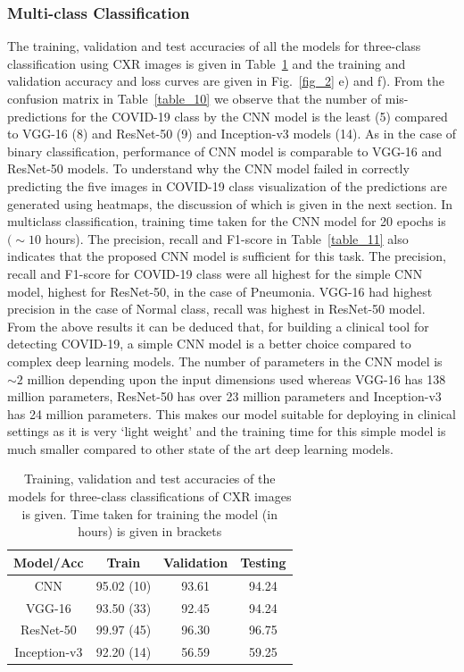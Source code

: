 \documentclass[10pt,journal,compsoc]{IEEEtran}
\begin{document}
\subsubsection{Multi-class Classification}
The training, validation and test accuracies of all the models for three-class classification using CXR images is given in Table~\ref{table_9} and the training and validation accuracy and loss curves are given in Fig.~\ref{fig_2} e) and f). From the confusion matrix in Table~\ref{table_10} we observe that the number of mis-predictions for the COVID-19 class by the CNN model is the least (5) compared to VGG-16 (8) and ResNet-50 (9) and Inception-v3 models (14). As in the case of binary classification, performance of CNN model is comparable to VGG-16 and ResNet-50 models. To understand why the CNN model failed in correctly predicting the five images in COVID-19 class visualization of the predictions are generated using heatmaps, the discussion of which is given in the next section. In multiclass classification, training time taken for the CNN model for 20 epochs is \((\sim10\) hours). The precision, recall and F1-score in Table~\ref{table_11} also indicates that the proposed CNN model is sufficient for this task. The precision, recall and F1-score for COVID-19 class were all highest for the simple CNN model, highest for ResNet-50, in the case of Pneumonia. VGG-16 had highest precision in the case of Normal class, recall was highest in ResNet-50 model. From the above results it can be deduced that, for building a clinical tool for detecting COVID-19, a simple CNN model is a better choice compared to complex deep learning models. The number of parameters in the CNN model is \(\sim2\) million depending upon the input dimensions used whereas VGG-16 has 138 million parameters, ResNet-50 has over 23 million parameters and Inception-v3 has 24 million parameters. This makes our model suitable for deploying in clinical settings as it is very ‘light weight’ and the training time for this simple model is much smaller compared to other state of the art deep learning models.

\begin{table}
\renewcommand{\arraystretch}{1.3}
\caption{Training, validation and test accuracies of the models for three-class classifications of CXR images is given. Time taken for training the model (in hours) is given in brackets}
\label{table_9}
\centering
\begin{tabular}{|c|c|c|c|}
\hline
\bfseries Model/Acc &  \bfseries Train & \bfseries Validation & \bfseries Testing \\
\hline
    CNN   & 95.02 (10)  & 93.61      & 94.24   \\
\hline
    VGG-16     & 93.50 (33)  & 92.45     & 94.24     \\
\hline
    ResNet-50    & 99.97 (45) & 96.30     & 96.75      \\
\hline
 Inception-v3    & 92.20 (14)  & 56.59     & 59.25       \\
\hline
\end{tabular}
\end{table}
\end{document}
